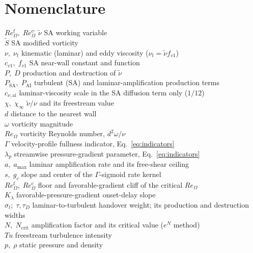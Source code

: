 \documentclass[journal]{new-aiaa}
\begin{document}
\section*{Nomenclature}
\begin{tabbing}
  $Re_\Omega^{\mathrm{f}},\;Re_\Omega^{\mathrm{c}}$\quad\quad \= \kill
  $\tilde\nu$ \> SA working variable \\
  $\tilde S$ \> SA modified vorticity \\
  $\nu,\;\nu_t$ \> kinematic (laminar) and eddy viscosity ($\nu_t=\tilde\nu f_{v1}$) \\
  $c_{v1},\;f_{v1}$ \> SA near-wall constant and function \\
  $P,\;D$ \> production and destruction of $\tilde\nu$ \\
  $P_\mathrm{SA},\;P_\mathrm{AI}$ \> turbulent (SA) and laminar-amplification production terms \\
  $c_{\nu,\mathrm{ai}}$ \> laminar-viscosity scale in the SA diffusion term only ($1/12$) \\
  $\chi,\;\chi_\infty$ \> $\tilde\nu/\nu$ and its freestream value \\
  $d$ \> distance to the nearest wall \\
  $\omega$ \> vorticity magnitude \\
  $Re_\Omega$ \> vorticity Reynolds number, $d^2\omega/\nu$ \\
  $\Gamma$ \> velocity-profile fullness indicator, Eq.~\eqref{eq:indicators} \\
  $\lambda_p$ \> streamwise pressure-gradient parameter, Eq.~\eqref{eq:indicators} \\
  $a,\;a_{\max}$ \> laminar amplification rate and its free-shear ceiling \\
  $s,\;g_c$ \> slope and center of the $\Gamma$-sigmoid rate kernel \\
  $Re_\Omega^{\mathrm{f}},\;Re_\Omega^{\mathrm{c}}$ \> floor and favorable-gradient cliff of the critical $Re_\Omega$ \\
  $K_\lambda$ \> favorable-pressure-gradient onset-delay slope \\
  $\sigma_t;\;\tau,\tau_D$ \> laminar-to-turbulent handover weight; its production and destruction widths \\
  $N,\;N_\mathrm{crit}$ \> amplification factor and its critical value ($e^N$ method) \\
  $Tu$ \> freestream turbulence intensity \\
  $p,\;\rho$ \> static pressure and density \\

\end{tabbing}
\end{document}
